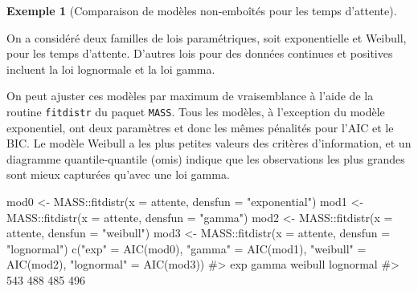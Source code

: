 \documentclass[
  11pt,
  letterpaper,
]{scrbook}
\newenvironment{Shaded}{\begin{snugshade}}{\end{snugshade}}
\newcommand{\AttributeTok}[1]{\textcolor[rgb]{0.40,0.45,0.13}{#1}}
\newcommand{\CommentTok}[1]{\textcolor[rgb]{0.37,0.37,0.37}{#1}}
\newcommand{\FunctionTok}[1]{\textcolor[rgb]{0.28,0.35,0.67}{#1}}
\newcommand{\NormalTok}[1]{\textcolor[rgb]{0.00,0.23,0.31}{#1}}
\newcommand{\OtherTok}[1]{\textcolor[rgb]{0.00,0.23,0.31}{#1}}
\newcommand{\SpecialCharTok}[1]{\textcolor[rgb]{0.37,0.37,0.37}{#1}}
\newcommand{\StringTok}[1]{\textcolor[rgb]{0.13,0.47,0.30}{#1}}
\theoremstyle{plain}
\theoremstyle{plain}
\theoremstyle{definition}
\newtheorem{example}{Exemple}[chapter]
\theoremstyle{definition}
\theoremstyle{remark}
\begin{document}
\begin{example}[Comparaison de modèles non-emboîtés pour les temps
d'attente]\protect\hypertarget{exm-aic}{}\label{exm-aic}

On a considéré deux familles de lois paramétriques, soit exponentielle
et Weibull, pour les temps d'attente. D'autres lois pour des données
continues et positives incluent la loi lognormale et la loi gamma.

On peut ajuster ces modèles par maximum de vraisemblance à l'aide de la
routine \texttt{fitdistr} du paquet \texttt{MASS}. Tous les modèles, à
l'exception du modèle exponentiel, ont deux paramètres et donc les mêmes
pénalités pour l'AIC et le BIC. Le modèle Weibull a les plus petites
valeurs des critères d'information, et un diagramme quantile-quantile
(omis) indique que les observations les plus grandes sont mieux
capturées qu'avec une loi gamma.

\begin{Shaded}
\begin{Highlighting}[]
\NormalTok{mod0 }\OtherTok{\textless{}{-}}\NormalTok{ MASS}\SpecialCharTok{::}\FunctionTok{fitdistr}\NormalTok{(}\AttributeTok{x =}\NormalTok{ attente, }\AttributeTok{densfun =} \StringTok{"exponential"}\NormalTok{)}
\NormalTok{mod1 }\OtherTok{\textless{}{-}}\NormalTok{ MASS}\SpecialCharTok{::}\FunctionTok{fitdistr}\NormalTok{(}\AttributeTok{x =}\NormalTok{ attente, }\AttributeTok{densfun =} \StringTok{"gamma"}\NormalTok{)}
\NormalTok{mod2 }\OtherTok{\textless{}{-}}\NormalTok{ MASS}\SpecialCharTok{::}\FunctionTok{fitdistr}\NormalTok{(}\AttributeTok{x =}\NormalTok{ attente, }\AttributeTok{densfun =} \StringTok{"weibull"}\NormalTok{)}
\NormalTok{mod3 }\OtherTok{\textless{}{-}}\NormalTok{ MASS}\SpecialCharTok{::}\FunctionTok{fitdistr}\NormalTok{(}\AttributeTok{x =}\NormalTok{ attente, }\AttributeTok{densfun =} \StringTok{"lognormal"}\NormalTok{)}
\FunctionTok{c}\NormalTok{(}\StringTok{"exp"} \OtherTok{=} \FunctionTok{AIC}\NormalTok{(mod0), }
  \StringTok{"gamma"} \OtherTok{=} \FunctionTok{AIC}\NormalTok{(mod1), }
  \StringTok{"weibull"} \OtherTok{=} \FunctionTok{AIC}\NormalTok{(mod2),}
  \StringTok{"lognormal"} \OtherTok{=} \FunctionTok{AIC}\NormalTok{(mod3))}
\CommentTok{\#\textgreater{}       exp     gamma   weibull lognormal }
\CommentTok{\#\textgreater{}       543       488       485       496}
\end{Highlighting}
\end{Shaded}

\end{example}
\end{document}
